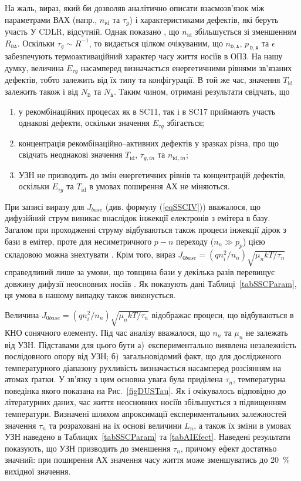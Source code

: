 На жаль, вираз, який би дозволяв аналітично описати взаємозв'язок між параметрами ВАХ (напр., $n_{\mathrm{id}}$ та $\tau_g$)
і характеристиками дефектів, які беруть участь У CDLR, відсутній.
Однак показано \cite{CDLR:JAP1995,CDLR:SSP}, що $n_{\mathrm{id}}$ збільшується зі зменшенням $R_{\mathtt{DA}}$.
Оскільки $\tau_g\sim R^{-1}$,
то видається цілком очікуваним, що $n_{\mathtt{D,A}}$, $p_{\,\mathtt{D,A}}$ та $\epsilon$ забезпечують термоактиваційний характер часу життя носіїв в ОПЗ.
На нашу думку, величина $E_{\tau g}$ насамперед визначається енергетичними рівнями зв'язаних дефектів, тобто
залежить від їх типу та конфігурації.
В той же час, значення $T_\mathrm{id}$ залежить також і від $N_\mathtt{D}$ та $N_\mathtt{A}$.
Таким чином, отримані результати свідчать, що
\begin{enumerate}[label=\asbuk*),leftmargin=0em,itemindent=1.5em]
\item у рекомбінаційних процесах як в SC11, так і в SC17 приймають участь однакові дефекти, оскільки значення $E_{\tau g}$ збігається;
\item концентрація рекомбінаційно--активних дефектів у зразках різна, про що свідчать неоднакові значення $T_\mathrm{id}$, $\tau_{g,in}$ та $n_{\mathrm{id},in}$;
\item УЗН не призводить до змін енергетичних рівнів та концентрацій дефектів, оскільки  $E_{\tau g}$ та $T_\mathrm{id}$ в умовах поширення АХ не міняються.
\end{enumerate}

При записі виразу для $J_{base}$ (див. формулу (\ref{eqSSCIV})) вважалося, що дифузійний струм виникає внаслідок інжекції
електронів з емітера в базу.
Загалом при проходженні струму відбуваються також процеси інжекції дірок з бази в емітер, проте для несиметричного $p-n$ переходу
($n_n\gg p_p$) цією складовою можна знехтувати \cite{Breitenstein2013}.
Крім того, вираз $J_{0base}=(qn_i^2/n_n)\sqrt{\mu_nkT/\tau_n}$ справедливий лише за умови, що товщина бази у декілька разів перевищує
довжину дифузії неосновних носіїв \cite{Sze2012}.
Як показують дані Таблиці~\ref{tabSSCParam}, ця умова в нашому випадку також виконується.

Величина $J_{0base}=(qn_i^2/n_n)\sqrt{\mu_nkT/\tau_n}$ відображає процеси, що відбуваються в КНО сонячного елементу.
Під час аналізу  вважалося, що $n_n$ та $\mu_n$ не залежать від УЗН.
Підставами для цього бути
а)~експериментально виявлена незалежність послідовного опору від УЗН;
б)~загальновідомий факт, що для дослідженого температурного діапазону рухливість визначається насамперед розсіянням на атомах ґратки.
У зв'язку з цим основна увага була приділена $\tau_n$, температурна поведінка якого показана на Рис.~\ref{figDUSTau}.
Як і очікувалось відповідно до літературних даних, час життя неосновних носіїв збільшується з підвищенням температури.
Визначені шляхом апроксимації експериментальних залежностей значення $\tau_n$ та розраховані на їх основі величини $L_n$,
а також їх зміни в умовах УЗН наведено в Таблицях~\ref{tabSSCParam} та \ref{tabAIEfect}.
Наведені результати показують, що УЗН призводить до зменшення $\tau_n$, причому ефект достатньо значний:
при поширення АХ значення часу життя може зменшуватись до 20~\% вихідної значення.

